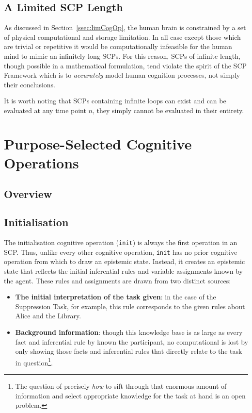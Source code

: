 \documentclass[
11pt, %
english, %
singlespacing, %
headsepline, %
]{MastersDoctoralThesis} %
\begin{document}
\subsection{A Limited SCP Length}
As discussed in Section~\ref{ssec:limCogOp}, the human brain is constrained by a set of physical computational and storage limitation. In all case except those which are trivial or repetitive it would be computationally infeasible for the human mind to mimic an infinitely long SCPs. For this reason, SCPs of infinite length, though possible in a mathematical formulation, tend violate the spirit of the SCP Framework which is to \textit{accurately} model human cognition processes, not simply their conclusions.

It is worth noting that SCPs containing infinite loops can exist and can be evaluated at any time point $n$, they simply cannot be evaluated in their entirety.

\section{Purpose-Selected Cognitive Operations}
\subsection{Overview}
\subsection{Initialisation}
The initialisation cognitive operation (\texttt{init}) is always the first operation in an SCP. Thus, unlike every other cognitive operation, \texttt{init} has no prior cognitive operation from which to draw an epistemic state. Instead, it creates an epistemic state that reflects the initial inferential rules and variable assignments known by the agent. These rules and assignments are drawn from two distinct sources:
\begin{itemize}
\item \textbf{The initial interpretation of the task given}: in the case of the Suppression Task, for example, this rule corresponds to the given rules about Alice and the Library.
\item \textbf{Background information}: though this knowledge base is as large as every fact and inferential rule by known the participant, no computational is lost by only showing those facts and inferential rules that directly relate to the task in question\footnote{The question of precisely \textit{how} to sift through that enormous amount of information and select appropriate knowledge for the task at hand is an open problem.}.
\end{itemize}
\end{document}
